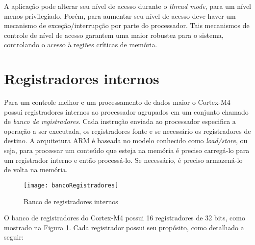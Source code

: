 A aplicação pode alterar seu nível de acesso durante o \emph{thread mode}, para um nível menos privilegiado. Porém, para aumentar seu nível de acesso deve haver um mecanismo de exceção/interrupção por parte do processador.  Tais mecanismos de controle de nível de acesso garantem uma maior robustez para o sistema, controlando o acesso à regiões críticas de memória.

\section{Registradores internos}

Para um controle melhor e um processamento de dados maior o Cortex-M4 possui registradores internos ao processador agrupados em um conjunto chamado de \emph{banco de registradores}. Cada instrução enviada ao processador especifica a operação a ser executada, os registradores fonte e se necessário os registradores de destino. A arquitetura ARM é baseada no modelo conhecido como \emph{load/store}, ou seja, para processar um conteúdo que esteja na memória é preciso carregá-lo para um registrador interno e então processá-lo. Se necessário, é preciso armazená-lo de volta na memória.

\begin{figure}[H]
	\centering
	\texttt{[image: bancoRegistradores]}
	\caption{Banco de registradores internos \cite{DATASHEET_TIVA}}
	\label{fig:bancoRegistradores}
\end{figure}

O banco de registradores do Cortex-M4 possui 16 registradores de 32 bits, como mostrado na Figura \ref{fig:bancoRegistradores}. Cada registrador possui seu propósito, como detalhado a seguir:

